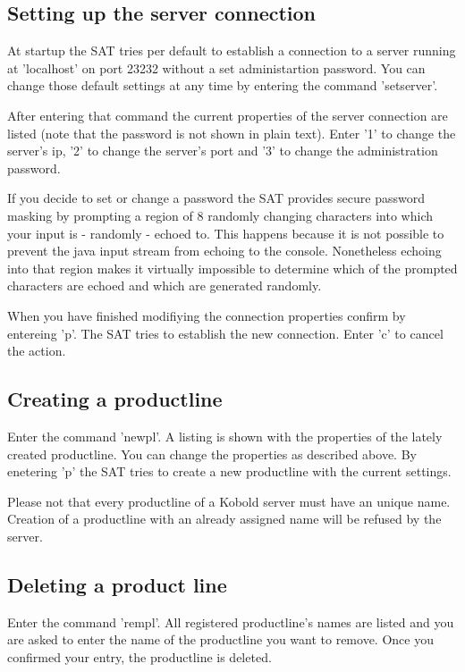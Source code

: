 \subsection{Setting up the server connection}
At startup the SAT tries per default to establish a connection to a server running 
at 'localhost' on port 23232 without a set administartion password. You can change
those default settings at any time by entering the command 'setserver'.\par

After entering that command the current properties of the server connection are 
listed (note that the password is not shown in plain text). Enter '1' to change
the server's ip, '2' to change the server's port and '3' to change the administration
password.\par

If you decide to set or change a password the SAT provides secure password masking by
prompting a region of 8 randomly changing characters into which your input is - randomly - 
echoed to. This happens because it is not possible to prevent the java input stream from
echoing to the console. Nonetheless echoing into that region makes it virtually impossible 
to determine which of the prompted characters are echoed and which are generated randomly.\par

When you have finished modifiying the connection properties confirm by entereing 'p'. The SAT 
tries to establish the new connection. Enter 'c' to cancel the action.

\subsection{Creating a productline}
Enter the command 'newpl'. A listing is shown with the properties of the lately created
productline. You can change the properties as described above. By enetering 'p' the SAT
tries to create a new productline with the current settings. \par

Please not that every productline of a Kobold server must have an unique name. Creation
of a productline with an already assigned name will be refused by the server.

\subsection{Deleting a product line}
Enter the command 'rempl'. All registered productline's names are listed and you are 
asked to enter the name of the productline you want to remove. Once you confirmed your 
entry, the productline is deleted.

